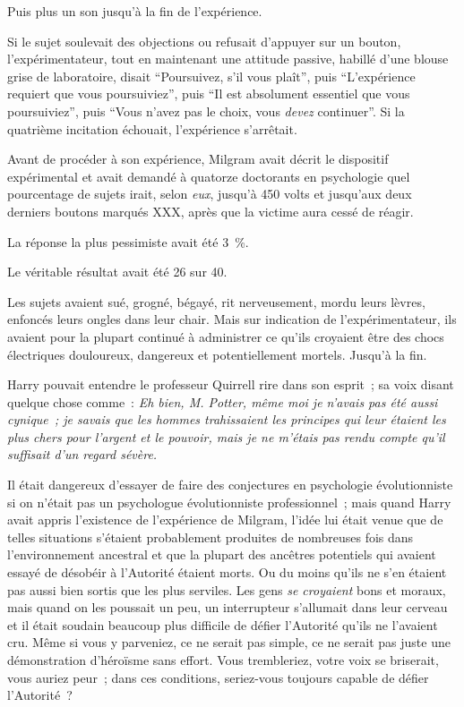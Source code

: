 Puis plus un son jusqu'à la fin de l'expérience.

Si le sujet soulevait des objections ou refusait d'appuyer sur un bouton, l'expérimentateur, tout en maintenant une attitude passive, habillé d'une blouse grise de laboratoire, disait “Poursuivez, s'il vous plaît”, puis “L'expérience requiert que vous poursuiviez”, puis “Il est absolument essentiel que vous poursuiviez”, puis “Vous n'avez pas le choix, vous \emph{devez} continuer”. Si la quatrième incitation échouait, l'expérience s'arrêtait.

Avant de procéder à son expérience, Milgram avait décrit le dispositif expérimental et avait demandé à quatorze doctorants en psychologie quel pourcentage de sujets irait, selon \emph{eux}, jusqu'à 450 volts et jusqu'aux deux derniers boutons marqués XXX, après que la victime aura cessé de réagir.

La réponse la plus pessimiste avait été 3~\%.

Le véritable résultat avait été 26 sur 40.

Les sujets avaient sué, grogné, bégayé, rit nerveusement, mordu leurs lèvres, enfoncés leurs ongles dans leur chair. Mais sur indication de l'expérimentateur, ils avaient pour la plupart continué à administrer ce qu'ils croyaient être des chocs électriques douloureux, dangereux et potentiellement mortels. Jusqu'à la fin.

Harry pouvait entendre le professeur Quirrell rire dans son esprit~; sa voix disant quelque chose comme~: \emph{Eh bien, M. Potter, même moi je n'avais pas été aussi cynique~; je savais que les hommes trahissaient les principes qui leur étaient les plus chers pour l'argent et le pouvoir, mais je ne m'étais pas rendu compte qu'il suffisait d'un regard sévère.}

Il était dangereux d'essayer de faire des conjectures en psychologie évolutionniste si on n'était pas un psychologue évolutionniste professionnel~; mais quand Harry avait appris l'existence de l'expérience de Milgram, l'idée lui était venue que de telles situations s'étaient probablement produites de nombreuses fois dans l'environnement ancestral et que la plupart des ancêtres potentiels qui avaient essayé de désobéir à l'Autorité étaient morts. Ou du moins qu'ils ne s'en étaient pas aussi bien sortis que les plus serviles. Les gens \emph{se croyaient} bons et moraux, mais quand on les poussait un peu, un interrupteur s'allumait dans leur cerveau et il était soudain beaucoup plus difficile de défier l'Autorité qu'ils ne l'avaient cru. Même si vous y parveniez, ce ne serait pas simple, ce ne serait pas juste une démonstration d'héroïsme sans effort. Vous trembleriez, votre voix se briserait, vous auriez peur~; dans ces conditions, seriez-vous toujours capable de défier l'Autorité~?

